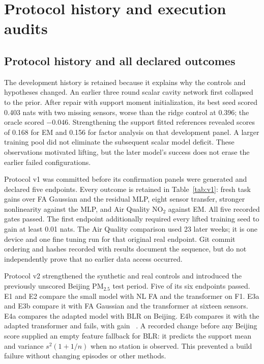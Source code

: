 \section{Protocol history and execution audits}
\label{app:audit}
\label{app:provenance}

\subsection{Protocol history and all declared outcomes}
\label{sec:protocol-history}




The development history is retained because it explains why the controls and hypotheses changed. An earlier three round scalar cavity network first collapsed to the prior. After repair with support moment initialization, its best seed scored 0.403 nats with two missing sensors, worse than the ridge control at 0.396; the oracle scored $-0.046$. Strengthening the support fitted references revealed scores of 0.168 for EM and 0.156 for factor analysis on that development panel. A larger training pool did not eliminate the subsequent scalar model deficit. These observations motivated lifting, but the later model's success does not erase the earlier failed configurations.

Protocol v1 was committed before its confirmation panels were generated and declared five endpoints. Every outcome is retained in Table~\ref{tab:v1}: fresh task gains over FA Gaussian and the residual MLP, eight sensor transfer, stronger nonlinearity against the MLP, and Air Quality NO$_2$ against EM. All five recorded gates passed. The first endpoint additionally required every lifted training seed to gain at least 0.01 nats. The Air Quality comparison used 23 later weeks; it is one device and one fine tuning run for that original real endpoint. Git commit ordering and hashes recorded with results document the sequence, but do not independently prove that no earlier data access occurred.

Protocol v2 strengthened the synthetic and real controls and introduced the previously unscored Beijing PM$_{2.5}$ test period. Five of its six endpoints passed. E1 and E2 compare the small model with NL FA and the transformer on F1. E3a and E3b compare it with FA Gaussian and the transformer at sixteen sensors. E4a compares the adapted model with BLR on Beijing. E4b compares it with the adapted transformer and fails, with gain \RbeijingeZerovspfn\ \RbeijingeZerovspfnci. A recorded change before any Beijing score supplied an empty feature fallback for BLR: it predicts the support mean and variance $s^2(1+1/n)$ when no station is observed. This prevented a build failure without changing episodes or other methods.

